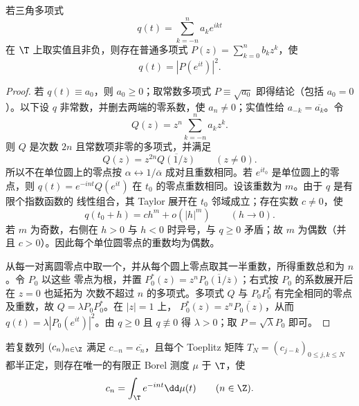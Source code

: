 \begin{lemma}\label{lemma:7-4-1-fejer-riesz}
若三角多项式
\[
 q(t)=\sum_{k=-n}^na_ke^{ikt}
\]
在 $\T$ 上取实值且非负，则存在普通多项式 $P(z)=\sum_{k=0}^nb_kz^k$，使
\[
 q(t)=|P(e^{it})|^2.
\]
\end{lemma}

\begin{proof}
若 $q(t)\equiv a_0$，则 $a_0\ge0$；取常数多项式 $P\equiv\sqrt{a_0}$ 即得结论（包括
$a_0=0$）。以下设 $q$ 非常数，并删去两端的零系数，使 $a_n\ne0$；实值性给
$a_{-k}=\overline{a_k}$。令
\[
 Q(z)=z^n\sum_{k=-n}^na_kz^k.
\]
则 $Q$ 是次数 $2n$ 且常数项非零的多项式，并满足
\[
 Q(z)=z^{2n}\overline{Q(1/\overline z)}\qquad(z\ne0).
\]
所以不在单位圆上的零点按 $\alpha\leftrightarrow1/\overline\alpha$ 成对且重数相同。若
$e^{it_0}$ 是单位圆上的零点，则
$q(t)=e^{-int}Q(e^{it})$ 在 $t_0$ 的零点重数相同。设该重数为 $m$。由于 $q$ 是有限个指数函数的
线性组合，其 Taylor 展开在 $t_0$ 邻域成立；存在实数 $c\ne0$，使
\[
 q(t_0+h)=ch^m+o(|h|^m)\qquad(h\to0).
\]
若 $m$ 为奇数，右侧在 $h>0$ 与 $h<0$ 时异号，与 $q\geq0$ 矛盾；故 $m$ 为偶数（并且
$c>0$）。因此每个单位圆零点的重数均为偶数。

从每一对离圆零点中取一个，并从每个圆上零点取其一半重数，所得重数总和为 $n$。令 $P_0$ 以这些
零点为根，并置
$P_0^*(z)=z^n\overline{P_0(1/\overline z)}$；右式按 $P_0$ 的系数展开后在 $z=0$ 也延拓为
次数不超过 $n$ 的多项式。多项式 $Q$ 与
$P_0P_0^*$ 有完全相同的零点及重数，故 $Q=\lambda P_0P_0^*$。在 $|z|=1$ 上，
$P_0^*(z)=z^n\overline{P_0(z)}$，从而
$q(t)=\lambda|P_0(e^{it})|^2$。由 $q\ge0$ 且 $q\not\equiv0$ 得 $\lambda>0$；取
$P=\sqrt\lambda P_0$ 即可。
\end{proof}

\begin{proposition}\label{proposition:7-4-1-herglotz-functional}
若复数列 $(c_n)_{n\in\Z}$ 满足 $c_{-n}=\overline{c_n}$，且每个 Toeplitz 矩阵
$T_N=(c_{j-k})_{0\le j,k\le N}$ 都半正定，则存在唯一的有限正 Borel 测度 $\mu$ 于 $\T$，使
\[
 c_n=\int_\T e^{-int}\dd\mu(t)\qquad(n\in\Z).
\]
\end{proposition}

